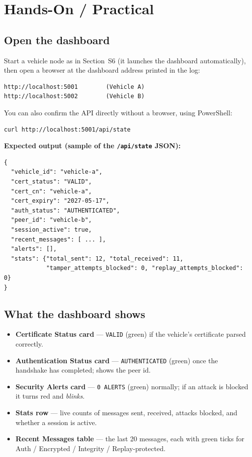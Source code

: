 \documentclass[11pt,a4paper]{report}
\begin{document}
\section{Hands-On / Practical}

\subsection{Open the dashboard}
Start a vehicle node as in Section~S6 (it launches the dashboard automatically),
then open a browser at the dashboard address printed in the log:
\begin{lstlisting}[style=term]
http://localhost:5001        (Vehicle A)
http://localhost:5002        (Vehicle B)
\end{lstlisting}

\noindent You can also confirm the API directly without a browser, using
PowerShell:
\begin{lstlisting}[style=term]
curl http://localhost:5001/api/state
\end{lstlisting}

\noindent\textbf{Expected output (sample of the \texttt{/api/state} JSON):}
\begin{lstlisting}[style=term]
{
  "vehicle_id": "vehicle-a",
  "cert_status": "VALID",
  "cert_cn": "vehicle-a",
  "cert_expiry": "2027-05-17",
  "auth_status": "AUTHENTICATED",
  "peer_id": "vehicle-b",
  "session_active": true,
  "recent_messages": [ ... ],
  "alerts": [],
  "stats": {"total_sent": 12, "total_received": 11,
            "tamper_attempts_blocked": 0, "replay_attempts_blocked": 0}
}
\end{lstlisting}

\subsection{What the dashboard shows}
\begin{itemize}
  \item \textbf{Certificate Status card} --- \texttt{VALID} (green) if the
        vehicle's certificate parsed correctly.
  \item \textbf{Authentication Status card} --- \texttt{AUTHENTICATED} (green)
        once the handshake has completed; shows the peer id.
  \item \textbf{Security Alerts card} --- \texttt{0 ALERTS} (green) normally; if
        an attack is blocked it turns red and \emph{blinks}.
  \item \textbf{Stats row} --- live counts of messages sent, received, attacks
        blocked, and whether a session is active.
  \item \textbf{Recent Messages table} --- the last 20 messages, each with
        green ticks for Auth / Encrypted / Integrity / Replay-protected.
\end{itemize}
\end{document}
